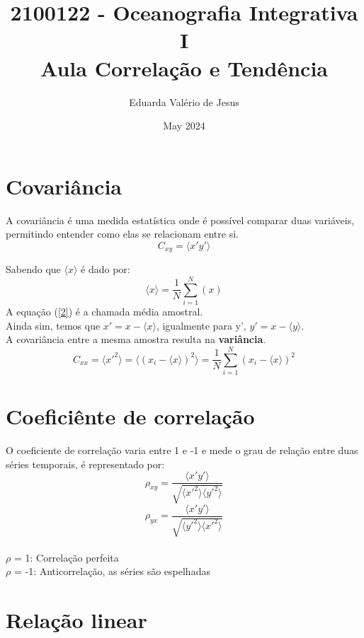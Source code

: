 \documentclass{article}
\title{2100122 - Oceanografia Integrativa I\\
Aula Correlação e Tendência}
\author{Eduarda  Valério de Jesus}
\date{May 2024}
\begin{document}
\maketitle

\section{Covariância}
A covariância é uma medida estatística onde é possível comparar duas variáveis, permitindo entender como elas se relacionam entre si. 
\begin{equation}
    C_{xy} = \langle x'y' \rangle
\end{equation}

Sabendo que $\langle x \rangle$ é dado por: 
\begin{equation}
    \langle x \rangle = \frac{1}{N}\sum_{i=1}^{N}(x) \label{2}
\end{equation}
A equação (\ref{2}) é a chamada média amostral.\\
Ainda sim, temos que $x' = x - \langle x \rangle$, igualmente para y', $y' = x - \langle y \rangle$.
\newline
\\
A covariância entre a mesma amostra resulta na \textbf{variância}.
\begin{equation}
    C_{xx} = \langle x'^2 \rangle = \langle (x_i - \langle x \rangle)^2\rangle = \frac{1}{N}\sum_{i=1}^{N} (x_i - \langle x \rangle)^2
\end{equation}

\section{Coeficiênte de correlação}
O coeficiente de correlação varia entre 1 e -1 e mede o grau de relação entre duas séries temporais, é representado por:
\begin{equation}
    \rho_{xy} = \frac{\langle x'y' \rangle}{\sqrt{\langle x'^2 \rangle \langle y'^2 \rangle}}
\end{equation}
\begin{equation}
    \rho_{yx} = \frac{\langle x'y' \rangle}{\sqrt{\langle y'^2 \rangle \langle x'^2 \rangle}}
\end{equation}
\\
$\rho$ = 1: Correlação perfeita\\
$\rho$ = -1: Anticorrelação, as séries são espelhadas

\newpage
\section{Relação linear}
\end{document}
